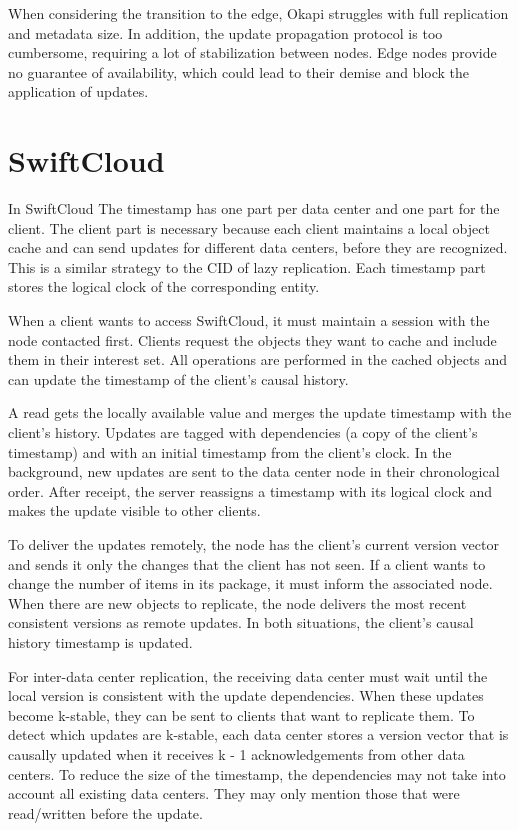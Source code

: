 When considering the transition to the edge, Okapi struggles with full replication and metadata size. In addition, the update propagation protocol is too cumbersome, requiring a lot of stabilization between nodes. Edge nodes provide no guarantee of availability, which could lead to their demise and block the application of updates.

\section{SwiftCloud}
\label{sec:soa:swiftcloud}

In SwiftCloud \cite{zawirski2015write} The timestamp has one part per data center and one part for the client. The client part is necessary because each client maintains a local object cache and can send updates for different data centers, before they are recognized. This is a similar strategy to the CID of lazy replication. Each timestamp part stores the logical clock of the corresponding entity. 

When a client wants to access SwiftCloud, it must maintain a session with the node contacted first. Clients request the objects they want to cache and include them in their interest set. All operations are performed in the cached objects and can update the timestamp of the client's causal history. 

A read gets the locally available value and merges the update timestamp with the client's history. Updates are tagged with dependencies (a copy of the client's timestamp) and with an initial timestamp from the client's clock. In the background, new updates are sent to the data center node in their chronological order. After receipt, the server reassigns a timestamp with its logical clock and makes the update visible to other clients. 

To deliver the updates remotely, the node has the client's current version vector and sends it only the changes that the client has not seen. If a client wants to change the number of items in its package, it must inform the associated node. When there are new objects to replicate, the node delivers the most recent consistent versions as remote updates. In both situations, the client's causal history timestamp is updated. 

For inter-data center replication, the receiving data center must wait until the local version is consistent with the update dependencies. When these updates become k-stable, they can be sent to clients that want to replicate them. To detect which updates are k-stable, each data center stores a version vector that is causally updated when it receives k - 1 acknowledgements from other data centers. To reduce the size of the timestamp, the dependencies may not take into account all existing data centers. They may only mention those that were read/written before the update. 

